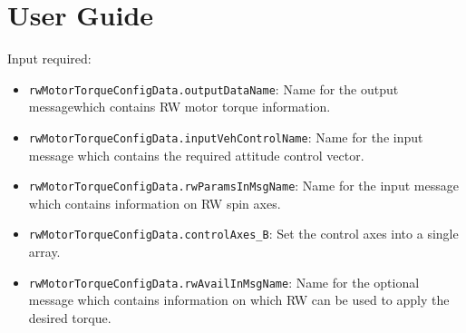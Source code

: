 

\section{User Guide}
Input required: 
\begin{itemize}
\item  \verb~rwMotorTorqueConfigData.outputDataName~: Name for the output messagewhich contains RW motor torque information.
\item  \verb~rwMotorTorqueConfigData.inputVehControlName~: Name for the input message which contains the required attitude control vector.
\item  \verb~rwMotorTorqueConfigData.rwParamsInMsgName~: Name for the input message which contains information on RW spin axes.
\item \verb~rwMotorTorqueConfigData.controlAxes_B~: Set the control axes into a single array.

\item  \verb~rwMotorTorqueConfigData.rwAvailInMsgName~: Name for the optional message  which contains information on which RW can be used to apply the desired torque. 



\end{itemize}
